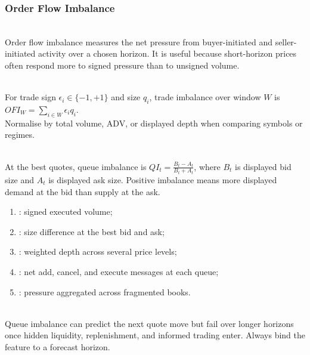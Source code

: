 \subsubsection{Order Flow Imbalance}

\begin{definition} \\
Order flow imbalance measures the net pressure from buyer-initiated and seller-initiated activity over a chosen horizon. It is useful because short-horizon prices often respond more to signed pressure than to unsigned volume.
\end{definition}

\begin{model} \\
For trade sign $\epsilon_i\in\{-1,+1\}$ and size $q_i$, trade imbalance over window $W$ is $OFI_W=\sum\limits_{i\in W}\epsilon_i q_i$.\\
Normalise by total volume, ADV, or displayed depth when comparing symbols or regimes.
\end{model}

\begin{model} \\
At the best quotes, queue imbalance is $QI_t=\frac{B_t-A_t}{B_t+A_t}$, where $B_t$ is displayed bid size and $A_t$ is displayed ask size. Positive imbalance means more displayed demand at the bid than supply at the ask.
\end{model}

\begin{taxonomy} 
\begin{enumerate}[label=\roman*.]
\setlength{\itemsep}{0pt}
\item {}: signed executed volume;
\item {}: size difference at the best bid and ask;
\item {}: weighted depth across several price levels;
\item {}: net add, cancel, and execute messages at each queue;
\item {}: pressure aggregated across fragmented books.
\end{enumerate}
\end{taxonomy}

\begin{caveat} \\
Queue imbalance can predict the next quote move but fail over longer horizons once hidden liquidity, replenishment, and informed trading enter. Always bind the feature to a forecast horizon.
\end{caveat}
